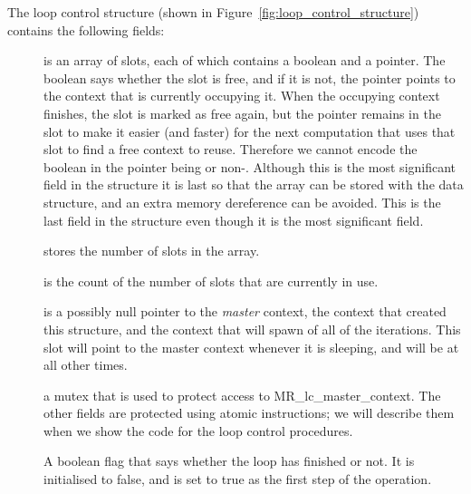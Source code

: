 The loop control structure
(shown in Figure~\ref{fig:loop_control_structure})
contains the following fields:
\begin{description}

\item[]
is an array of slots, each of which contains a boolean and a pointer.
The boolean says whether the slot is free,
and if it is not,
the pointer points to the context that is currently occupying it.
When the occupying context finishes,
the slot is marked as free again,
but the pointer remains in the slot
to make it easier (and faster) for the next computation that uses that slot
to find a free context to reuse.
Therefore we cannot encode the boolean in the pointer being \NULL or non-\NULL.
Although this is the most significant field in the structure it is last so that
the array can be stored with the data structure, and an extra memory
dereference can be avoided.
This is the last field in the structure even though it is the most significant field.

\item[]
stores the number of slots in the array.

\item[]
is the count of the number of slots that are currently in use.

\item[]
is a possibly null pointer to the \emph{master} context,
the context that created this structure,
and the context that will spawn of all of the iterations.
This slot will point to the master context whenever it is sleeping,
and will be \NULL at all other times.

\item[]
a mutex that is used to protect access to MR\_lc\_master\_context.
The other fields are protected using atomic instructions;
we will describe them when we show the code for the loop control procedures.

\item[]
A boolean flag that says whether the loop has finished or not.
It is initialised to false, and is set to true
as the first step of the \lcfinish operation.


\end{description}
